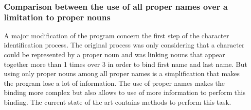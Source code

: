 \documentclass[a4paper, 12pt]{report}
\begin{document}
\begin{table}
\center
{}\\
\caption{Different type of characters appearance}\label{appearance_type}
\end{table}


\subsubsection{Comparison between the use of all proper names over a limitation to proper nouns}
A major modification of the program concern the first step of the character identification process.
The original process was only considering that a character could be represented by a proper noun and was linking nouns that appear together more than 1 times over 3
in order to bind first name and last name.
But using only proper nouns among all proper names is a simplification that makes the program lose a lot of information.
The use of proper names makes the binding more complex but also allows to use of more information to perform this binding.
The current state of the art contains methods to perform this task. \\

\begin{table}
\center
{}\\
\caption{Different type of characters appearance}\label{properNounsNames}
\end{table}
\end{document}
